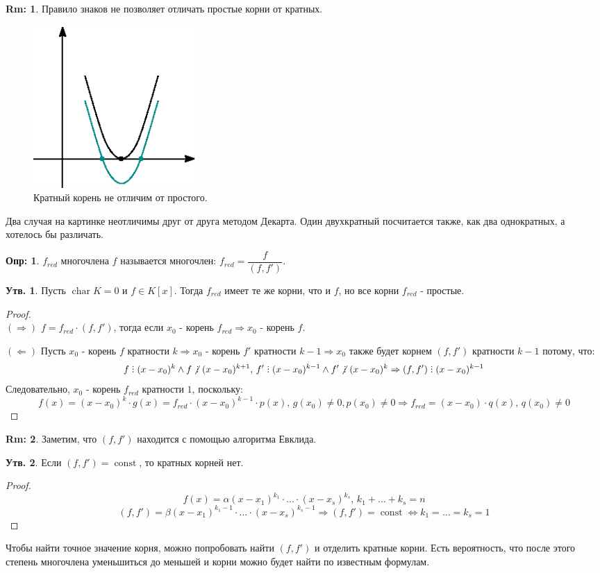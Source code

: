 \documentclass[12pt]{article}
\theoremstyle{definition}
\newtheorem{defn}{Опр:}
\newtheorem{rem}{Rm:}
\newtheorem{prop}{Утв.}
\DeclareRobustCommand{\divby}{%
	\mathrel{\text{\vbox{\baselineskip.65ex\lineskiplimit0pt\hbox{.}\hbox{.}\hbox{.}}}}%
}
\DeclareRobustCommand{\ndivby}{\mkern-1mu\not\mathrel{\mkern4.5mu\divby}\mkern1mu}
\DeclareMathOperator{\const}{\text{const}}
\DeclareMathOperator{\Char}{\operatorname{char}}
\begin{document}
\begin{rem}
	Правило знаков не позволяет отличать простые корни от кратных.
	\begin{figure}[H]
		\centering
		\includegraphics[width=0.3\textwidth]{AL1L19_5.eps}
		\caption{Кратный корень не отличим от простого.}
		\label{19_5}
	\end{figure}
	Два случая на картинке неотличимы друг от друга методом Декарта. Один двухкратный посчитается также, как два однократных, а хотелось бы различать.
\end{rem}
\begin{defn}
	 $f_{red}$ многочлена $f$ называется многочлен: $f_{red} = \dfrac{f}{(f,f')}$.
\end{defn}
\begin{prop}
	Пусть $\Char{K} = 0$ и $f \in K[x]$. Тогда $f_{red}$ имеет те же корни, что и $f$, но все корни $f_{red}$ - простые. 
\end{prop}
\begin{proof}\hfill\\
	$(\Rightarrow)$ $f = f_{red}{\cdot}(f,f')$, тогда если $x_0$ - корень $f_{red} \Rightarrow x_0$ - корень $f$.
	
	$(\Leftarrow)$ Пусть $x_0$ - корень $f$ кратности $k \Rightarrow x_0$ - корень $f'$ кратности $k-1 \Rightarrow x_0$ также будет корнем $(f,f')$ кратности $k-1$ потому, что:
	$$
		f \divby (x- x_0)^k  \wedge f \ndivby  (x- x_0)^{k+1}, \, 	f' \divby (x- x_0)^{k-1}  \wedge f' \ndivby  (x- x_0)^{k} \Rightarrow (f,f') \divby (x - x_0)^{k-1}
	$$
	Следовательно, $x_0$ - корень $f_{red}$ кратности $1$, поскольку:
	$$
		f(x) = (x - x_0)^k{\cdot}g(x) = f_{red}{\cdot}(x- x_0)^{k-1}{\cdot}p(x), \, g(x_0) \neq 0, p(x_0) \neq 0 \Rightarrow f_{red} = (x - x_0){\cdot}q(x), \, q(x_0) \neq 0
	$$
\end{proof}
\begin{rem}
	Заметим, что $(f,f')$ находится с помощью алгоритма Евклида.
\end{rem}
\begin{prop}
	Если $(f,f') = \const$, то кратных корней нет.
\end{prop}
\begin{proof}
	$$
		f(x) = \alpha(x- x_1)^{k_1}{\cdot}\dotsc{\cdot}(x - x_s)^{k_s}, \, k_1 + \dotsc + k_s = n
	$$
	$$
		(f,f') = \beta(x - x_1)^{k_1 - 1}{\cdot}\dotsc{\cdot}(x - x_s)^{k_s - 1} \Rightarrow (f,f') = \const \Leftrightarrow k_1 = \dotsc = k_s = 1
	$$
\end{proof}
Чтобы найти точное значение корня, можно попробовать найти $(f,f')$ и отделить кратные корни. Есть вероятность, что после этого степень многочлена уменьшиться до меньшей и корни можно будет найти по известным формулам.
\newpage
\end{document}
